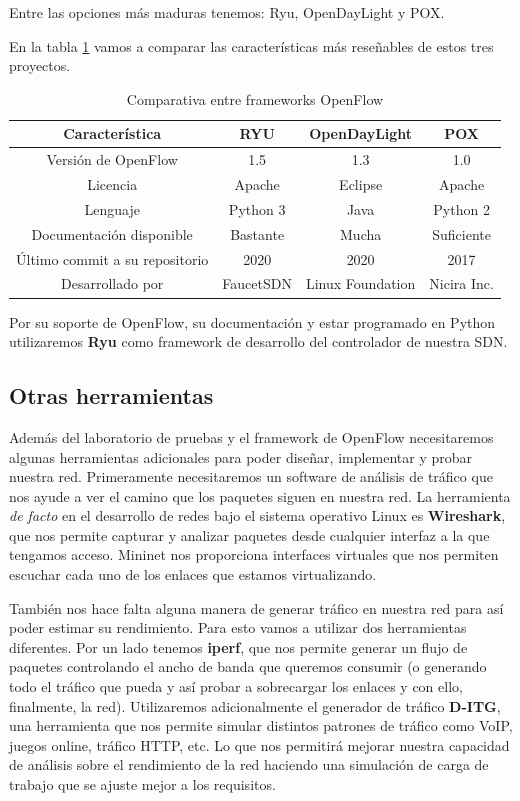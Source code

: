 Entre las opciones más maduras tenemos: Ryu, OpenDayLight y POX.

En la tabla \ref{tab:comparativa_frameworks} vamos a comparar las características más reseñables de estos tres proyectos.

\begin{table}[h!]
    \centering
    \begin{tabular}{|c|c|c|c|}
    \hline
        Característica & RYU & OpenDayLight & POX  \\
    \hline
        Versión de OpenFlow & 1.5 & 1.3 & 1.0 \\
    \hline
        Licencia & Apache & Eclipse & Apache \\
    \hline
        Lenguaje & Python 3 & Java  & Python 2\\
    \hline
        Documentación disponible & Bastante & Mucha  & Suficiente \\
    \hline
        Último commit a su repositorio & 2020 & 2020  & 2017 \\
    \hline
        Desarrollado por & FaucetSDN  & Linux Foundation  & Nicira Inc.\\
    \hline
    \end{tabular}
    \caption{Comparativa entre frameworks OpenFlow}
    \label{tab:comparativa_frameworks}
\end{table}

Por su soporte de OpenFlow, su documentación y estar programado en Python utilizaremos \textbf{Ryu} como framework de desarrollo del controlador de nuestra SDN.

\subsection{Otras herramientas}

Además del laboratorio de pruebas y el framework de OpenFlow necesitaremos algunas herramientas adicionales para poder diseñar, implementar y probar nuestra red. Primeramente necesitaremos un software de análisis de tráfico que nos ayude a ver el camino que los paquetes siguen en nuestra red. La herramienta \emph{de facto} en el desarrollo de redes bajo el sistema operativo Linux es \textbf{Wireshark}, que nos permite capturar y analizar paquetes desde cualquier interfaz a la que tengamos acceso. Mininet nos proporciona interfaces virtuales que nos permiten escuchar cada uno de los enlaces que estamos virtualizando.

También nos hace falta alguna manera de generar tráfico en nuestra red para así poder estimar su rendimiento. Para esto vamos a utilizar dos herramientas diferentes. Por un lado tenemos \textbf{iperf}, que nos permite generar un flujo de paquetes controlando el ancho de banda que queremos consumir (o generando todo el tráfico que pueda y así probar a sobrecargar los enlaces y con ello, finalmente, la red). Utilizaremos adicionalmente el generador de tráfico \textbf{D-ITG}, una herramienta que nos permite simular distintos patrones de tráfico como VoIP, juegos online, tráfico HTTP, etc. Lo que nos permitirá mejorar nuestra capacidad de análisis sobre el rendimiento de la red haciendo una simulación de carga de trabajo que se ajuste mejor a los requisitos.


